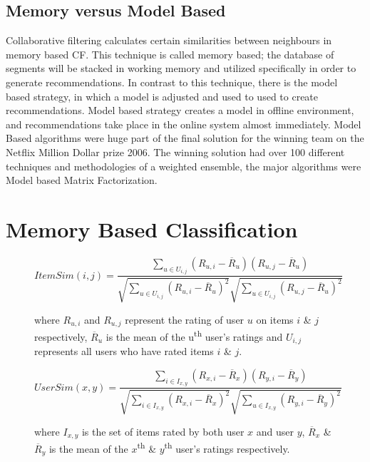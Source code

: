 \documentclass[10pt,conference]{IEEEtran}
\begin{document}
\subsection{Memory versus Model Based}
Collaborative filtering calculates certain similarities between neighbours in memory based CF. This technique is called memory based; the database of segments will be stacked in working memory and utilized specifically in order to generate recommendations. In contrast to this technique, there is the model based strategy, in which a model is adjusted and used to used to create recommendations. Model based strategy creates a model in offline environment, and recommendations take place in the online system almost immediately. Model Based algorithms were huge part of the final solution for the winning team on the Netflix Million Dollar prize 2006. The winning solution had over 100 different techniques and methodologies of a weighted ensemble, the major algorithms were Model based Matrix Factorization.

\section{Memory Based Classification}

\begin{figure}[b]
\begin{equation}
ItemSim(i, j) = \frac{\sum_{u \in U_{i,j}} ({R_{u,i} - \overline{R}_u}) ({R_{u,j} - \overline{R}_u})} {\sqrt{\sum_{u \in U_{i,j}}({R_{u,i} - \overline{R}_u})^2} \sqrt{\sum_{u \in U_{i,j}}({R_{u,j} - \overline{R}_u})^2}}
\label{eq:ItemSim} \tag{4}
\end{equation}


where $R_{u,i}$ and $R_{u,j}$ represent the rating of user $u$ on items $i$ \& $j$ respectively,  $\overline{R}_u$ is the mean of the u\textsuperscript{th} user's ratings and $U_{i,j}$ represents all users who have rated items $i$ \& $j$.

\end{figure}

\begin{figure}[b]
\begin{equation}
UserSim(x, y) = \frac{\sum_{i \in I_{x,y}} ({R_{x,i} - \overline{R}_x}) ({R_{y,i} - \overline{R}_y})} {\sqrt{\sum_{i \in I_{x,y}}({R_{x,i} - \overline{R}_x})^2} \sqrt{\sum_{u \in I_{x,y}}({R_{y,i} - \overline{R}_y})^2}}
\label{eq:UserSim} \tag{6}
\end{equation}


where $I_{x,y}$ is the set of items rated by both user $x$ and user $y$, $\overline{R}_x$ \& $\overline{R}_y$ is the mean of the $x$\textsuperscript{th} \& $y$\textsuperscript{th} user's ratings respectively.

\end{figure}
\end{document}
